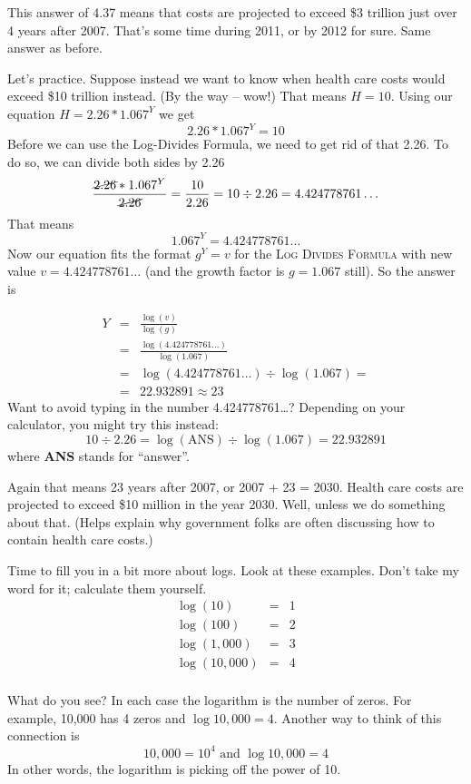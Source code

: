 This answer of 4.37 means that costs are projected to exceed \$3 trillion just over 4 years after 2007.  That's some time during 2011, or by 2012 for sure.  Same answer as before. 

Let's practice. Suppose instead we want to know when health care costs would exceed \$10 trillion instead.  (By the way -- wow!)  That means $H = 10$.  Using our equation $H=2.26\ast1.067^Y$ we get $$2.26\ast1.067^Y=10$$
Before we can use the Log-Divides Formula, we need to get rid of that 2.26.  To do so, we can divide both sides by 2.26
$$\frac{\cancel{2.26}\ast1.067^Y}{\cancel{2.26}}=\frac{10}{2.26}=10 \div 2.26 = 4.424778761\ldots$$ 
That means
$$1.067^Y=4.424778761\ldots$$
Now our equation fits the format $g^Y=v$ for the \textsc{Log Divides Formula} with new value $v=4.424778761\ldots$ (and the growth factor is $g=1.067$ still).  So the answer is 

\begin{eqnarray*}
Y & = &  \frac{\log (v)}{\log(g)}\\
& = &  \frac{\log (4.424778761\ldots)}{\log(1.067)}\\
& =  &  \log (4.424778761\ldots) \div \log (1.067) = \\
& =  &  22.932891 \approx 23 
\end{eqnarray*}
Want to avoid typing in the number 4.424778761\ldots? Depending on your calculator, you might try this instead:
$$10 \div 2.26 = \log(\text{ANS}) \div \log(1.067)= 22.932891$$
where \textbf{ANS} stands for ``answer''.  %

Again that means 23 years after 2007, or 2007 + 23 = 2030.  Health care costs are projected to exceed \$10 million in the year 2030.  Well, unless we do something about that.  (Helps explain why government folks are often discussing how to contain health care costs.)

Time to fill you in a bit more about logs.  Look at these examples.  Don't take my word for it; calculate them yourself.
\begin{eqnarray*}
\log (10) & = & 1 \\
\log (100) & = & 2 \\
\log (1,000) & = & 3 \\
\log (10,000) & = & 4 \\
\end{eqnarray*}
\vspace{-.5in} %

\noindent What do you see?  In each case the logarithm is the number of zeros.  For example, 10,000 has 4 zeros and $\log 10,000=4$.  Another way to think of this connection is $$ 10,000 = 10^4 \text{ and } \log 10,000=4$$ In other words, the logarithm is picking off the power of 10.  

